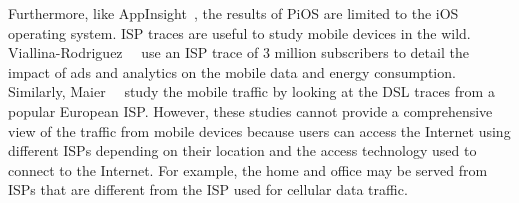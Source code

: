 {Furthermore, like AppInsight~\cite{ravindranath:appinsight}, the results of PiOS are limited to the iOS operating system. 
ISP traces are useful to study mobile devices in the wild. 
Viallina-Rodriguez~\etal~\cite{vallina-rod:ads} use an ISP trace of 3 million subscribers to detail the impact of ads and analytics on the mobile data and energy consumption. 
Similarly, Maier~\etal~\cite{maier:mobtraffic} study the mobile traffic by looking at the DSL traces from a popular European ISP. 
However, these studies cannot provide a comprehensive view of the traffic from mobile devices because users can access the Internet using different ISPs depending on their location and the access technology used to connect to the Internet. 
For example, the home \wifi and office \wifi may be served from ISPs that are different from the ISP used for cellular data traffic.}

